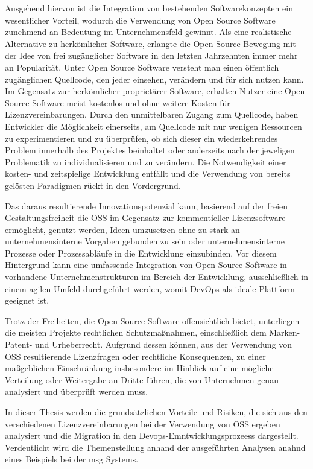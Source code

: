 Ausgehend hiervon ist die Integration von bestehenden Softwarekonzepten ein wesentlicher Vorteil, wodurch die Verwendung von Open Source Software zunehmend an Bedeutung im Unternehmensfeld gewinnt. Als eine realistische Alternative zu herkömlicher Software, erlangte die Open-Source-Bewegung mit der Idee von frei zugänglicher Software in den letzten Jahrzehnten immer mehr an Popularität. Unter Open Source Software versteht man einen öffentlich zugänglichen Quellcode, den jeder einsehen, verändern und für sich nutzen kann. Im Gegensatz zur herkömlicher proprietärer Software, erhalten Nutzer eine Open Source Software meist kostenlos und ohne weitere Kosten für Lizenzvereinbarungen. Durch den unmittelbaren Zugang zum Quellcode, haben Entwickler die Möglichkeit einerseits, am Quellcode mit nur wenigen Ressourcen zu experimentieren und zu überprüfen, ob sich dieser ein wiederkehrendes Problem innerhalb des Projektes beinhaltet oder anderseits nach der jeweligen Problematik zu individualisieren und zu verändern. Die Notwendigkeit einer kosten- und zeitspielige Entwicklung entfällt und die Verwendung von bereits gelösten Paradigmen rückt in den Vordergrund.   


Das daraus resultierende Innovationspotenzial kann, basierend auf der freien Gestaltungsfreiheit die OSS im Gegensatz zur kommentieller Lizenzsoftware ermöglicht, genutzt werden, Ideen umzusetzen ohne zu stark an unternehmensinterne Vorgaben gebunden zu sein oder unternehmensinterne Prozesse oder Prozessabläufe in die Entwicklung einzubinden. Vor diesem Hintergrund kann eine umfassende Integration von Open Source Software in vorhandene Unternehmenstrukturen im Bereich der Entwicklung, ausschließlich in einem agilen Umfeld durchgeführt werden, womit DevOps als ideale Plattform geeignet ist.  

Trotz der Freiheiten, die Open Source Software offensichtlich bietet, unterliegen die meisten Projekte rechtlichen Schutzmaßnahmen, einschließlich dem Marken- Patent- und Urheberrecht. Aufgrund dessen können, aus der Verwendung von OSS resultierende Lizenzfragen oder rechtliche Konsequenzen, zu einer maßgeblichen Einschränkung insbesondere im Hinblick auf eine mögliche Verteilung oder Weitergabe an Dritte führen, die von Unternehmen genau analysiert und überprüft werden muss.  

In dieser Thesis werden die grundsätzlichen Vorteile und Risiken, die sich aus den verschiedenen Lizenzvereinbarungen bei der Verwendung von OSS ergeben analysiert und die Migration in den Devops-Emntwicklungsprozeess dargestellt. Verdeutlicht wird die Themenstellung anhand der ausgeführten Analysen anahnd eines Beispiels bei der msg Systems. 
